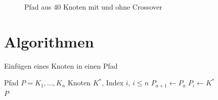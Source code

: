 \begin{figure}[h]
    \begin{center}
    \end{center}
\end{figure}
\begin{figure}\ContinuedFloat
    \begin{center}
        \caption{Pfad aus 40 Knoten mit und ohne Crossover}
    \end{center}
\end{figure}\label{app:fig:40-nodes-crossover-example}

\section{Algorithmen}
\begin{algorithm}[h]
    \caption{Einfügen eines Knoten in einen Pfad}
    \label{alg:merge-node-into-path}
    \begin{algorithmic}[1]
        \Require Pfad $P = K_1,\ldots,K_n$
        \Require Knoten $K^*$, Index $i$, $i \leq n$
            \State $P_{a+1} \gets P_a$
        \EndFor
        \State $P_i \gets K^*$ \\
        \Return $P$
    \end{algorithmic}
\end{algorithm}

